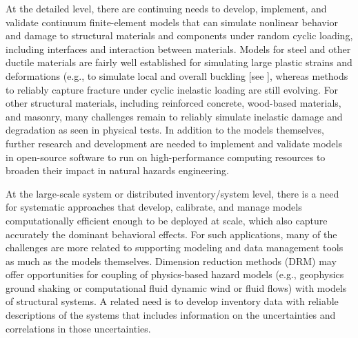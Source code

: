 At the detailed level, there are continuing needs to develop, implement, and validate continuum finite-element models that can simulate nonlinear behavior and damage to structural materials and components under random cyclic loading, including interfaces and interaction between materials. Models for steel and other ductile materials are fairly well established for simulating large plastic strains and deformations (e.g., to simulate local and overall buckling [see \cite{n.i.s.t.-a.t.c.2018blind}], whereas methods to reliably capture fracture under cyclic inelastic loading are still evolving. For other structural materials, including reinforced concrete, wood-based materials, and masonry, many challenges remain to reliably simulate inelastic damage and degradation as seen in physical tests. In addition to the models themselves, further research and development are needed to implement and validate models in open-source software to run on high-performance computing resources to broaden their impact in natural hazards engineering.

At the large-scale system or distributed inventory/system level, there is a need for systematic approaches that develop, calibrate, and manage models computationally efficient enough to be deployed at scale, which also capture accurately the dominant behavioral effects. For such applications, many of the challenges are more related to supporting modeling and data management tools as much as the models themselves. Dimension reduction methods (DRM) may offer opportunities for coupling of physics-based hazard models (e.g., geophysics ground shaking or computational fluid dynamic wind or fluid flows) with models of structural systems. A related need is to develop inventory data with reliable descriptions of the systems that includes information on the uncertainties and correlations in those uncertainties.

